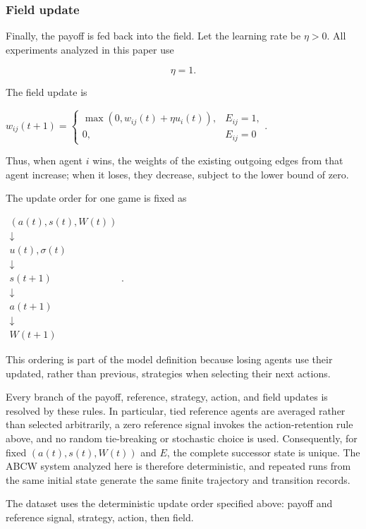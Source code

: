 \documentclass[
  11pt,
]{article}
\begin{document}
\subsubsection{Field update}\label{field-update}

Finally, the payoff is fed back into the field. Let the learning rate be
\({\eta>0}\). All experiments analyzed in this paper use

\[{\eta=1.}\]

The field update is

\({w_{ij}(t+1)= \begin{cases} \max\!\left(0,w_{ij}(t)+\eta u_i(t)\right),&E_{ij}=1,\\ 0,&E_{ij}=0 \end{cases}.}\)

Thus, when agent \({i}\) wins, the weights of the existing outgoing
edges from that agent increase; when it loses, they decrease, subject to
the lower bound of zero.

The update order for one game is fixed as

\({\begin{array}{c} (a(t),s(t),W(t))\\ \downarrow\\ u(t),\sigma(t)\\ \downarrow\\ s(t+1)\\ \downarrow\\ a(t+1)\\ \downarrow\\ W(t+1) \end{array}.}\)

This ordering is part of the model definition because losing agents use
their updated, rather than previous, strategies when selecting their
next actions.

Every branch of the payoff, reference, strategy, action, and field
updates is resolved by these rules. In particular, tied reference agents
are averaged rather than selected arbitrarily, a zero reference signal
invokes the action-retention rule above, and no random tie-breaking or
stochastic choice is used. Consequently, for fixed
\({(a(t),s(t),W(t))}\) and \({E}\), the complete successor state is
unique. The ABCW system analyzed here is therefore deterministic, and
repeated runs from the same initial state generate the same finite
trajectory and transition records.

The dataset uses the deterministic update order specified above: payoff and reference signal, strategy, action, then field.
\end{document}
